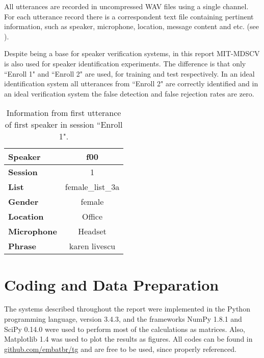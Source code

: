 All utterances are recorded in uncompressed WAV files using a single channel. For each utterance record there is a correspondent text file containing pertinent information, such as speaker, microphone, location, message content and etc. (see ).

Despite being a base for speaker verification systems, in this report MIT-MDSCV is also used for speaker identification experiments. The difference is that only ``Enroll 1" and ``Enroll 2" are used, for training and test respectively. In an ideal identification system all utterances from ``Enroll 2" are correctly identified and in an ideal verification system the false detection and false rejection rates are zero.

\begin{table}[h]
    \centering
    \begin{tabular}{|l|c|}
    \hline
    {\bf Speaker}    & f00              \\ \hline
    {\bf Session}    & 1                \\ \hline
    {\bf List}       & female\_list\_3a \\ \hline
    {\bf Gender}     & female           \\ \hline
    {\bf Location}   & Office           \\ \hline
    {\bf Microphone} & Headset          \\ \hline
    {\bf Phrase}     & karen livescu    \\ \hline
    \end{tabular}
    \caption{Information from first utterance of first speaker in session ``Enroll 1".}
    \label{tab:utterance-info}
\end{table}

\section{Coding and Data Preparation}
\label{sec:coding-and-data-preparation}

The systems described throughout the report were implemented in the Python programming language, version 3.4.3, and the frameworks NumPy 1.8.1 and SciPy 0.14.0 were used to perform most of the calculations as matrices. Also, Matplotlib 1.4 was used to plot the results as figures. All codes can be found in \url{github.com/embatbr/tg} and are free to be used, since properly referenced.

